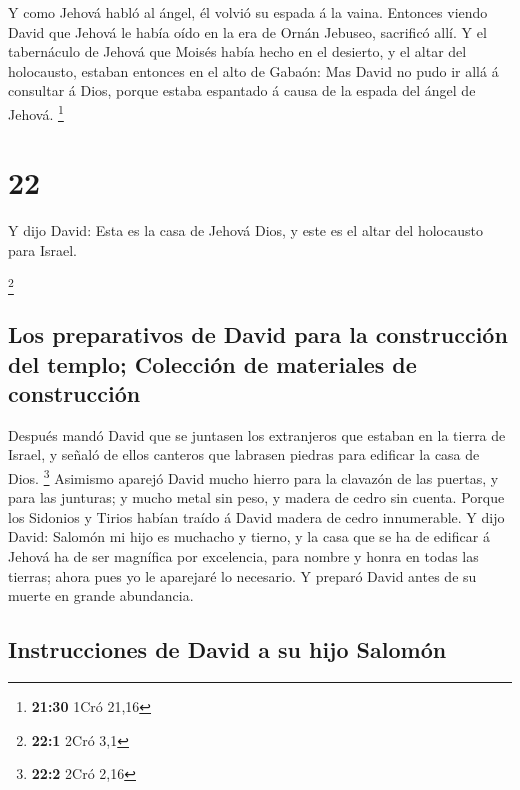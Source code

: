  Y como Jehová habló al ángel, él volvió su espada á la
vaina.  Entonces viendo David que Jehová le había oído en
la era de Ornán Jebuseo, sacrificó allí.  Y el tabernáculo
de Jehová que Moisés había hecho en el desierto, y el altar del
holocausto, estaban entonces en el alto de Gabaón: Mas David no pudo ir
allá á consultar á Dios, porque estaba espantado á causa de la espada
del ángel de Jehová. \footnote{\textbf{21:30} 1Cró 21,16}

\hypertarget{section-21}{%
\section{22}\label{section-21}}

 Y dijo David: Esta es la casa de Jehová Dios, y este es el
altar del holocausto para Israel.

\footnote{\textbf{22:1} 2Cró 3,1}

\hypertarget{los-preparativos-de-david-para-la-construcciuxf3n-del-templo-colecciuxf3n-de-materiales-de-construcciuxf3n}{%
\subsection{Los preparativos de David para la construcción del templo;
Colección de materiales de
construcción}\label{los-preparativos-de-david-para-la-construcciuxf3n-del-templo-colecciuxf3n-de-materiales-de-construcciuxf3n}}

 Después mandó David que se juntasen los extranjeros que
estaban en la tierra de Israel, y señaló de ellos canteros que labrasen
piedras para edificar la casa de Dios. \footnote{\textbf{22:2} 2Cró 2,16}
 Asimismo aparejó David mucho hierro para la clavazón de las
puertas, y para las junturas; y mucho metal sin peso, y madera de cedro
sin cuenta.  Porque los Sidonios y Tirios habían traído á
David madera de cedro innumerable.  Y dijo David: Salomón mi
hijo es muchacho y tierno, y la casa que se ha de edificar á Jehová ha
de ser magnífica por excelencia, para nombre y honra en todas las
tierras; ahora pues yo le aparejaré lo necesario. Y preparó David antes
de su muerte en grande abundancia.

\hypertarget{instrucciones-de-david-a-su-hijo-salomuxf3n}{%
\subsection{Instrucciones de David a su hijo
Salomón}\label{instrucciones-de-david-a-su-hijo-salomuxf3n}}


